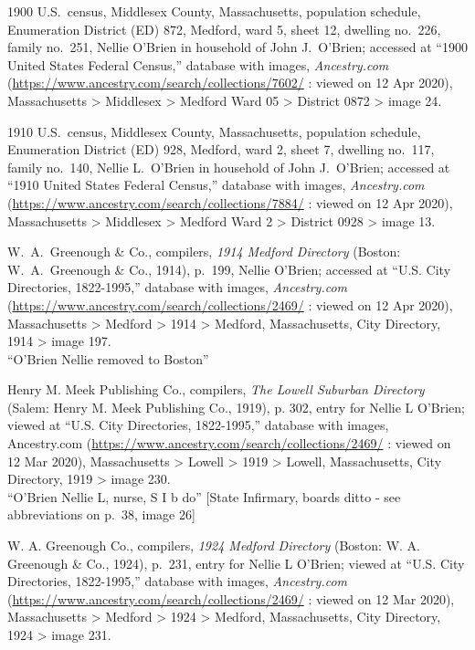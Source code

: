 \begin{thebibliography}{999}
	1900 U.S.\ census, Middlesex County, Massachusetts, population schedule, Enumeration District (ED) 872, Medford, ward 5, sheet 12, dwelling no.\ 226, family no.\ 251, Nellie O'Brien in household of John J.\ O'Brien; accessed at ``1900 United States Federal Census,'' database with images, \textit{Ancestry.com} (\url{https://www.ancestry.com/search/collections/7602/} : viewed on 12 Apr 2020), Massachusetts > Middlesex > Medford Ward 05 > District 0872 > image 24.
	
	1910 U.S.\ census, Middlesex County, Massachusetts, population schedule, Enumeration District (ED) 928, Medford, ward 2, sheet 7, dwelling no.\ 117, family no.\ 140, Nellie L.\ O'Brien in household of John J.\ O'Brien; accessed at ``1910 United States Federal Census,'' database with images, \textit{Ancestry.com} (\url{https://www.ancestry.com/search/collections/7884/} : viewed on 12 Apr 2020), Massachusetts > Middlesex > Medford Ward 2 > District 0928 > image 13.
	
	W.\ A.\ Greenough \& Co., compilers, \textit{1914 Medford Directory} (Boston: W.\ A.\ Greenough \& Co., 1914), p.\ 199, Nellie O'Brien; accessed at ``U.S. City Directories, 1822-1995,'' database with images, \textit{Ancestry.com} (\url{https://www.ancestry.com/search/collections/2469/} : viewed on 12 Apr 2020), Massachusetts > Medford > 1914 > Medford, Massachusetts, City Directory, 1914 > image 197.\\
	``O'Brien Nellie removed to Boston''
	
	Henry M. Meek Publishing Co., compilers, \textit{The Lowell Suburban Directory} (Salem: Henry M. Meek Publishing Co., 1919), p. 302, entry for Nellie L O'Brien; viewed at ``U.S. City Directories, 1822-1995,'' database with images, Ancestry.com (\url{https://www.ancestry.com/search/collections/2469/} : viewed on 12 Mar 2020), Massachusetts > Lowell > 1919 > Lowell, Massachusetts, City Directory, 1919 > image 230.\\
	``O'Brien Nellie L, nurse, S I b do'' [State Infirmary, boards ditto - see abbreviations on p.\ 38, image 26]
	
	W. A. Greenough Co., compilers, \textit{1924 Medford Directory} (Boston: W. A. Greenough \& Co., 1924), p.\ 231, entry for Nellie L O'Brien; viewed at ``U.S. City Directories, 1822-1995,'' database with images, \textit{Ancestry.com} (\url{https://www.ancestry.com/search/collections/2469/} : viewed on 12 Mar 2020), Massachusetts > Medford > 1924 > Medford, Massachusetts, City Directory, 1924 > image 231.
	

\end{thebibliography}
